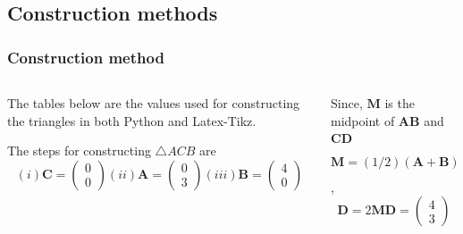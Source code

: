 \documentclass{beamer}
\renewcommand{\vec}[1]{\mathbf{#1}}
\begin{document}
\subsection*{Construction methods}
\begin{frame}[fragile]
\footnotesize
\frametitle{Construction method}
\begin{columns}
\begin{column}{0.5\textwidth}
The tables below are the values used for constructing the triangles in both Python and Latex-Tikz.
\begin{table}[htbp]
\centering
\caption{\tiny To construct $\triangle ACB$}
\end{table}
The steps for constructing $\triangle ACB$ are
\newline
$$(i)\vec{C}= \begin{pmatrix}0\\0\end{pmatrix}
(ii)\vec{A}=\begin{pmatrix}0\\3\end{pmatrix}
(iii)\vec{B}=\begin{pmatrix}4\\0\end{pmatrix}$$
\end{column}
\begin{column}{0.5\textwidth}
Since, $\vec{M}$ is the midpoint of $\vec{AB}$ and $\vec{CD}$
\\
$$\vec{M}=(1/2)(\vec{A}+\vec{B})
\vec{M}=\begin{pmatrix}2\\1.5\end{pmatrix}$$,
\\
$$\vec{D}=2\vec{M}
\vec{D}=\begin{pmatrix}4\\3\end{pmatrix}$$
\begin{table}[H]
\centering
\resizebox{0.5\textwidth}{!}{\begin{minipage}{\textwidth}

\end{minipage}}
\end{table}
\end{column}
\end{columns}
\end{frame}
\end{document}

